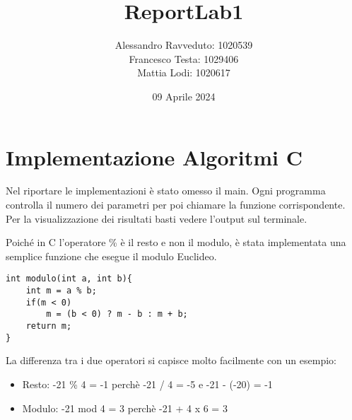 \documentclass{article}
\title{ReportLab1}
\author{Alessandro Ravveduto: 1020539\\
Francesco Testa: 1029406\\
Mattia Lodi: 1020617}
\date{09 Aprile 2024}
\begin{document}
\maketitle

\section{Implementazione Algoritmi C}
Nel riportare le implementazioni \`{e} stato omesso il main. Ogni programma controlla il numero dei parametri per poi chiamare la funzione corrispondente. Per la visualizzazione dei risultati basti vedere l'output sul terminale.

Poiché in C l'operatore \% \`{e} il resto e non il modulo, \`{e} stata implementata una semplice funzione che esegue il modulo Euclideo.
\begin{lstlisting}[style=CStyle]
int modulo(int a, int b){
    int m = a % b;
    if(m < 0)
        m = (b < 0) ? m - b : m + b;
    return m;
}
\end{lstlisting}
La differenza tra i due operatori si capisce molto facilmente con un esempio: 
\begin{itemize}
    \item Resto: -21 \% 4 = -1 perch\`{e} -21 / 4 = -5 e -21 - (-20) = -1
    \item Modulo: -21 mod 4 = 3 perch\`{e} -21 + 4 x 6 = 3
\end{itemize}
\end{document}

